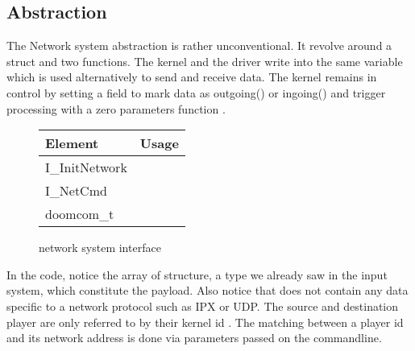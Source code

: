 \subsection{Abstraction}
The Network system abstraction is rather unconventional. It revolve around a struct   and two functions. The kernel and the driver write into the same variable which is used alternatively to send and receive data. The kernel remains in control by setting a field  to mark data as outgoing() or ingoing() and trigger processing with a zero parameters function .\\
\par
 \begin{figure}[H]
\centering  
\begin{tabularx}{\textwidth}{ L{0.6}  L{1.4}}
  \toprule
  \textbf{Element} &  \textbf{Usage}\\

  \toprule 
   I\_InitNetwork & \\
   I\_NetCmd & \\
   doomcom\_t & \\
   \toprule
\end{tabularx}
\caption{\doom network system interface}
\end{figure}
\par














\par
In the code, notice the array of  structure, a type we already saw in the input system, which constitute the payload. Also notice that  does not contain any data specific to a network protocol such as IPX or UDP. The source and destination player are only referred to by their kernel id . The matching between a player id and its network address is done via parameters passed on the commandline.\\
\par




